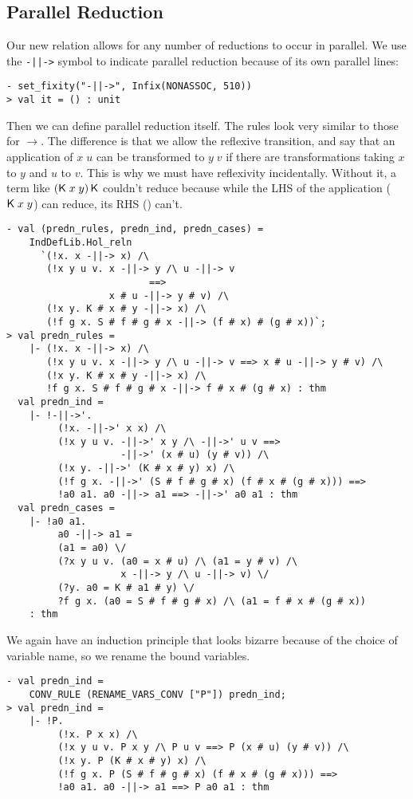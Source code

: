 \documentclass[12pt]{article}
\newcommand{\KC}{\con{K}}
\begin{document}
\subsection{Parallel Reduction}
\label{sec:Parallel-Reduction}

Our new relation allows for any number of reductions to occur in
parallel.  We use the \texttt{-||->} symbol to indicate parallel
reduction because of its own parallel lines:
\begin{session}\begin{verbatim}
- set_fixity("-||->", Infix(NONASSOC, 510))
> val it = () : unit
\end{verbatim}\end{session}
    Then we can define parallel reduction itself.  The rules look very
    similar to those for $\rightarrow$.  The difference is that we
    allow the reflexive transition, and say that an application of
    $x\;u$ can be transformed to $y\;v$ if there are transformations
    taking $x$ to $y$ and $u$ to $v$.  This is why we must have
    reflexivity incidentally.  Without it, a term like
    $(\KC\;x\;y)\,\KC$ couldn't reduce because while the LHS of the
    application ($\KC\;x\;y$) can reduce, its RHS (\KC) can't.
\begin{session}\begin{verbatim}
- val (predn_rules, predn_ind, predn_cases) =
    IndDefLib.Hol_reln
      `(!x. x -||-> x) /\
       (!x y u v. x -||-> y /\ u -||-> v
                         ==>
                  x # u -||-> y # v) /\
       (!x y. K # x # y -||-> x) /\
       (!f g x. S # f # g # x -||-> (f # x) # (g # x))`;
> val predn_rules =
    |- (!x. x -||-> x) /\
       (!x y u v. x -||-> y /\ u -||-> v ==> x # u -||-> y # v) /\
       (!x y. K # x # y -||-> x) /\
       !f g x. S # f # g # x -||-> f # x # (g # x) : thm
  val predn_ind =
    |- !-||->'.
         (!x. -||->' x x) /\
         (!x y u v. -||->' x y /\ -||->' u v ==>
                    -||->' (x # u) (y # v)) /\
         (!x y. -||->' (K # x # y) x) /\
         (!f g x. -||->' (S # f # g # x) (f # x # (g # x))) ==>
         !a0 a1. a0 -||-> a1 ==> -||->' a0 a1 : thm
  val predn_cases =
    |- !a0 a1.
         a0 -||-> a1 =
         (a1 = a0) \/
         (?x y u v. (a0 = x # u) /\ (a1 = y # v) /\
                    x -||-> y /\ u -||-> v) \/
         (?y. a0 = K # a1 # y) \/
         ?f g x. (a0 = S # f # g # x) /\ (a1 = f # x # (g # x))
    : thm
\end{verbatim}\end{session}
We again have an induction principle that looks bizarre because of the
choice of variable name, so we rename the bound variables.
\begin{session}\begin{verbatim}
- val predn_ind =
    CONV_RULE (RENAME_VARS_CONV ["P"]) predn_ind;
> val predn_ind =
    |- !P.
         (!x. P x x) /\
         (!x y u v. P x y /\ P u v ==> P (x # u) (y # v)) /\
         (!x y. P (K # x # y) x) /\
         (!f g x. P (S # f # g # x) (f # x # (g # x))) ==>
         !a0 a1. a0 -||-> a1 ==> P a0 a1 : thm
\end{verbatim}\end{session}
\end{document}
